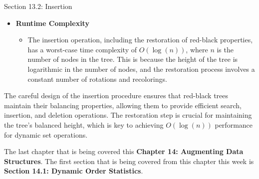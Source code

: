 \begin{notes}{Section 13.2: Insertion}
\begin{itemize}
        \item \textbf{Runtime Complexity}
        \begin{itemize}
            \item The insertion operation, including the restoration of red-black properties, has a worst-case time complexity of $O(\log{(n)})$, where $n$ is the number of nodes in the tree. This is 
            because the height of the tree is logarithmic in the number of nodes, and the restoration process involves a constant number of rotations and recolorings.
        \end{itemize}
    \end{itemize}
    
    \begin{highlight}
        The careful design of the insertion procedure ensures that red-black trees maintain their balancing properties, allowing them to provide efficient search, insertion, and deletion operations. 
        The restoration step is crucial for maintaining the tree's balanced height, which is key to achieving $O(\log{(n)})$ performance for dynamic set operations.
    \end{highlight}    
\end{notes}

The last chapter that is being covered this \textbf{Chapter 14: Augmenting Data Structures}. The first section that is being covered from this chapter this week is \textbf{Section 14.1: Dynamic Order Statistics}.

